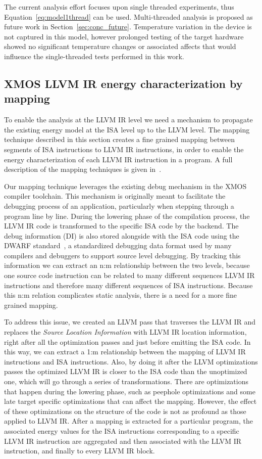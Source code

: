 \documentclass[9pt,preprint]{sigplanconf}
\newcommand{\secref}[1]{Section~\ref{sec:#1}}
\begin{document}
The current analysis effort focuses upon single threaded experiments, thus
Equation~\ref{eq:model1thread} can be used. Multi-threaded analysis is proposed
as future work in \secref{conc_future}. Temperature variation in the device is
not captured in this model, however prolonged testing of the target hardware
showed no significant temperature changes or associated affects that would
influence the single-threaded tests performed in this work.


\subsection{XMOS LLVM IR energy characterization by mapping}
\label{sec:mapping}
To enable the analysis at the LLVM IR level we need a mechanism to propagate
the existing energy model at the ISA level up to the LLVM level. The mapping
technique described in this section creates a fine grained
mapping between segments of ISA instructions to LLVM IR instructions, in order
to enable the energy characterization of each LLVM IR instruction in a program.
A full description of the mapping techniques is given in~\cite{Georgiou14}.

Our mapping technique leverages the existing debug mechanism in the XMOS compiler
toolchain. This mechanism is originally meant to
facilitate the debugging process of an application, particularly when stepping
through a program line by line.
During the lowering phase of the compilation process, the LLVM
IR code is transformed to the specific ISA code by the
backend. The debug information (DI) is also stored alongside with the ISA
code using the DWARF standard~\cite{DWARF:2013:Online}, a standardized
debugging data format used by many compilers and debuggers to support source level
debugging.
By tracking this information we can extract an n:m relationship between the two levels, because one
source code instruction can be related to many different sequences LLVM IR instructions and therefore
many different sequences of ISA instructions. Because this n:m relation complicates static
analysis, there is a need for a more fine grained mapping.

To address this issue, we created an LLVM pass that traverses the LLVM IR and
replaces the \emph{Source Location Information} with LLVM IR location information,
right after all the optimization passes and just before emitting the ISA code.
In this way, we can extract a 1:m relationship between the mapping of LLVM
IR instructions and ISA instructions.
Also, by doing it after the LLVM optimizations
passes the optimized LLVM IR is closer to the ISA code than the unoptimized one,
which will go through a series of transformations.
There are optimizations that happen during the lowering phase,
such as peephole optimizations and some late target specific optimizations
that can affect the mapping. However, the effect of these optimizations on the
structure of the code is not as profound as those
applied to LLVM IR. After a mapping is extracted for a particular program,
the associated energy values for the ISA instructions corresponding
to a specific LLVM IR instruction are aggregated and then associated with the LLVM
IR instruction, and finally to every LLVM IR block.
\end{document}
